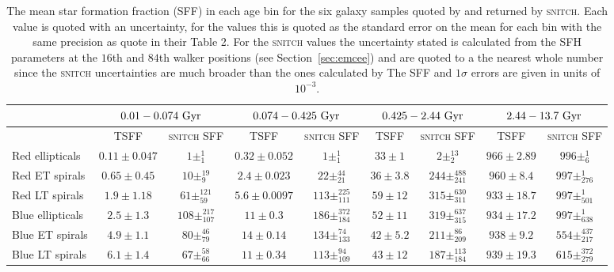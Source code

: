 \documentclass[useAMS,usenatbib]{mn2e}
\begin{document}
\begin{table*}
\centering
\caption{The mean star formation fraction (SFF) in each age bin for the six galaxy samples quoted by \protect\cite[][TSFF]{tojeiro13} and returned by \textsc{snitch}. Each value is quoted with an uncertainty, for the \protect\cite{tojeiro13} values this is quoted as the standard error on the mean for each bin with the same precision as \protect\citeauthor{tojeiro13} quote in their Table 2. For the \textsc{snitch} values the uncertainty stated is calculated from the SFH parameters at the $16$th and $84$th walker positions (see Section~\ref{sec:emcee}) and are quoted to a the nearest whole number since the \textsc{snitch} uncertainties are much broader than the ones calculated by \protect\citeauthor{tojeiro13} The SFF and $1\sigma$ errors are given in units of $10^{-3}$.}
\label{table:tojeirocompare}
\begin{tabular*}{\textwidth}{l|cc|cc|cc|cc}
                        & \multicolumn{2}{c|}{$0.01 - 0.074~\rm{Gyr}$}     & \multicolumn{2}{c|}{$0.074 - 0.425~\rm{Gyr}$} & \multicolumn{2}{c|}{$0.425 - 2.44~\rm{Gyr}$} & \multicolumn{2}{c}{$2.44 - 13.7~\rm{Gyr}$} \\ \hline
                        & TSFF & \textsc{snitch} SFF & TSFF          & \textsc{snitch} SFF          & TSFF          & \textsc{snitch} SFF         & TSFF         & \textsc{snitch} SFF        \\ \hline
Red ellipticals         & $0.11\pm0.047$   &  $1\pm_{1}^{1}$ &  $0.32\pm0.052$  &    $1\pm_{1}^{1}$   &  $33\pm1$   &   $2\pm_{2}^{13}$   &  $966\pm2.89$  &   $996\pm_{6}^{1}$   \\
Red ET spirals  & $0.65\pm0.45$   &  $10\pm_{9}^{19}$ &  $2.4\pm0.023$   &  $22\pm_{21}^{44}$     &  $36\pm3.8$   &   $244\pm_{241}^{488}$  &  $960\pm8.4$  &  $997\pm_{276}^{1}$    \\
Red LT spirals   &  $1.9\pm1.18$   &  $61\pm_{59}^{121}$  &  $5.6\pm0.0097$   &   $113\pm_{111}^{225}$    &  $59\pm12$   &   $315\pm_{311}^{630}$   &  $933\pm18.7$  &   $997\pm_{501}^{1}$    \\ \hline
Blue ellipticals        &  $2.5\pm1.3$   &  $108\pm_{107}^{217}$   &  $11\pm0.3$    &   $186\pm_{184}^{372}$    &  $52\pm11$   &   $319\pm_{315}^{637}$   &  $934\pm17.2$  &     $997\pm_{638}^{1}$ \\
Blue ET spirals &  $4.9\pm1.1$   &  $80\pm_{79}^{46}$  &  $14\pm0.14$    &   $134\pm_{133}^{74}$    &  $42\pm5.2$   &   $211\pm_{209}^{86}$   &  $938\pm9.2$  &  $554\pm_{217}^{437}$     \\
Blue LT spirals  &  $6.1\pm1.4$   &  $67\pm_{66}^{58}$  &  $11\pm0.34$   &   $113\pm_{109}^{94}$    &  $43\pm12$   &    $187\pm_{184}^{113}$  &  $939\pm19.3$  & $615\pm_{279}^{372}$                              
\end{tabular*}
\end{table*}
\end{document}
